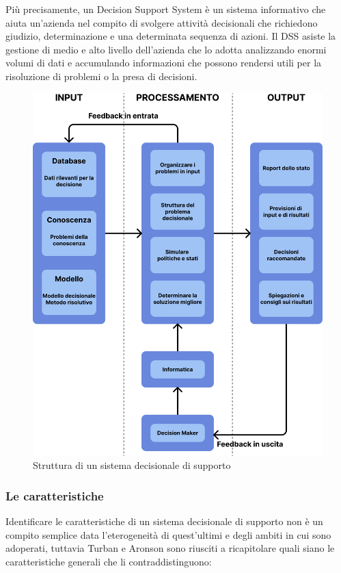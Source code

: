 Più precisamente, un Decision Support System è un sistema informativo che aiuta un'azienda nel compito di svolgere attività decisionali che richiedono giudizio, determinazione e una determinata sequenza di azioni. Il DSS asiste la gestione di medio e alto livello dell'azienda che lo adotta analizzando enormi volumi di dati e accumulando informazioni che possono rendersi utili per la risoluzione di problemi o la presa di decisioni.\cite{cfi_dss}

\begin{figure} [H]
    \centering
    \includegraphics[height=1\linewidth]{figure/capitolo_2/Decision Support System Structure.pdf}
    \caption{Struttura di un sistema decisionale di supporto}
    \label{fig:Decision Support System Structure}
\end{figure}

\subsubsection{Le caratteristiche}

Identificare le caratteristiche di un sistema decisionale di supporto non è un compito semplice data l'eterogeneità di quest'ultimi e degli ambiti in cui sono adoperati, tuttavia Turban e Aronson sono riusciti a ricapitolare quali siano le caratteristiche generali che li contraddistinguono:\cite{dss_characteristics}

